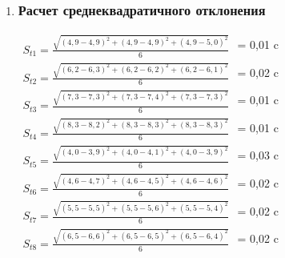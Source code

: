 \begin{enumerate}
		\item \subsubsection*{Расчет среднеквадратичного отклонения}
		\label{appendix: 2}
		\(\begin{aligned}S_{t 1} = \frac{\sqrt{(4,9 - 4,9)^2 + (4,9 - 4,9)^2 + (4,9 - 5,0)^2}}{6}\end{aligned}\) = 0,01 c\\
		\(\begin{aligned}S_{t 2} = \frac{\sqrt{(6,2 - 6,3)^2 + (6,2 - 6,2)^2 + (6,2 - 6,1)^2}}{6}\end{aligned}\) = 0,02 c\\
		\(\begin{aligned}S_{t 3} = \frac{\sqrt{(7,3 - 7,3)^2 + (7,3 - 7,4)^2 + (7,3 - 7,3)^2}}{6}\end{aligned}\) = 0,01 c\\ 
		\(\begin{aligned}S_{t 4} = \frac{\sqrt{(8,3 - 8,2)^2 + (8,3 - 8,3)^2 + (8,3 - 8,3)^2}}{6}\end{aligned}\) = 0,01 c\\
		\(\begin{aligned}S_{t 5} = \frac{\sqrt{(4,0 - 3,9)^2 + (4,0 - 4,1)^2 + (4,0 - 3,9)^2}}{6}\end{aligned}\) = 0,03 c\\ 
		\(\begin{aligned}S_{t 6} = \frac{\sqrt{(4,6 - 4,7)^2 + (4,6 - 4,5)^2 + (4,6 - 4,6)^2}}{6}\end{aligned}\) = 0,02 c\\
		\(\begin{aligned}S_{t 7} = \frac{\sqrt{(5,5 - 5,5)^2 + (5,5 - 5,6)^2 + (5,5 - 5,4)^2}}{6}\end{aligned}\) = 0,02 c\\
		\(\begin{aligned}S_{t 8} = \frac{\sqrt{(6,5 - 6,6)^2 + (6,5 - 6,5)^2 + (6,5 - 6,4)^2}}{6}\end{aligned}\) = 0,02 c\\
				

\end{enumerate}
